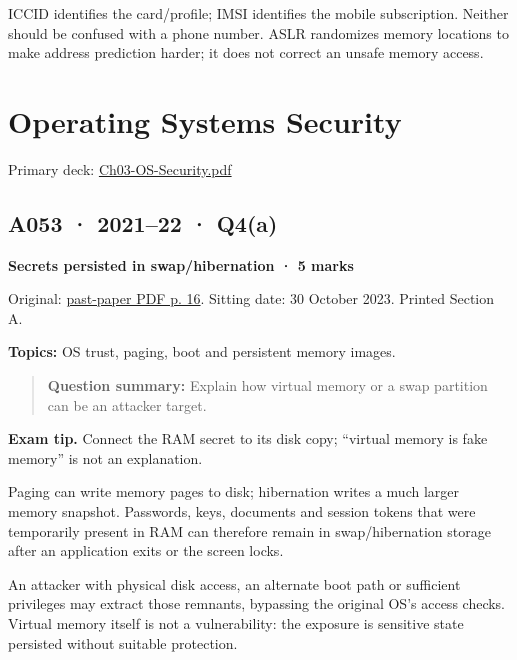 \documentclass[11pt,a4paper]{article}
\begin{document}
ICCID identifies the card/\allowbreak{}profile; IMSI identifies the mobile subscription. Neither should be confused with a phone number. ASLR randomizes memory locations to make address prediction harder; it does not correct an unsafe memory access.



\clearpage
\section{Operating Systems Security}

Primary deck: \href{../slides/Ch03-OS-Security.pdf}{Ch03-OS-Security.\allowbreak{}pdf}




\subsection{A053 · 2021–22 · Q4(a)}\label{a053}

\textbf{Secrets persisted in swap/\allowbreak{}hibernation · 5 marks}


Original: \href{../../CSE405-Security_Merged.pdf\#page=16}{past-paper PDF p. 16}. Sitting date: 30 October 2023. Printed Section A.


\textbf{Topics:} OS trust,\allowbreak{} paging,\allowbreak{} boot and persistent memory images.



\begin{quote}\small

\textbf{Question summary:} Explain how virtual memory or a swap partition can be an attacker target.



\end{quote}


{\color{ForestGreen}\textbf{Exam tip.} Connect the RAM secret to its disk copy; “virtual memory is fake memory” is not an explanation.}


Paging can write memory pages to disk; hibernation writes a much larger memory snapshot. Passwords,\allowbreak{} keys,\allowbreak{} documents and session tokens that were temporarily present in RAM can therefore remain in swap/\allowbreak{}hibernation storage after an application exits or the screen locks.


An attacker with physical disk access,\allowbreak{} an alternate boot path or sufficient privileges may extract those remnants,\allowbreak{} bypassing the original OS's access checks. Virtual memory itself is not a vulnerability: the exposure is sensitive state persisted without suitable protection.
\end{document}
